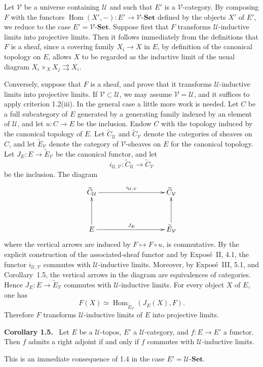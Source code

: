 \documentclass[11pt]{article}
\newcommand{\U}{\mathcal{U}}
\newcommand{\V}{\mathcal{V}}
\newcommand{\Set}{\mathbf{Set}}
\newcommand{\Hom}{\operatorname{Hom}}
\newenvironment{statement}[1]{\par\medskip\noindent\textbf{#1.}\ }{\par\medskip}
\begin{document}
Let \(\V\) be a universe containing \(\U\) and such that \(E'\) is a \(\V\)-category. By composing \(F\) with the functors \(\Hom(X',-):E'\to\V\text{-}\Set\) defined by the objects \(X'\) of \(E'\), we reduce to the case \(E'=\V\text{-}\Set\). Suppose first that \(F\) transforms \(\U\)-inductive limits into projective limits. Then it follows immediately from the definitions that \(F\) is a sheaf, since a covering family \(X_i\to X\) in \(E\), by definition of the canonical topology on \(E\), allows \(X\) to be regarded as the inductive limit of the usual diagram \(X_i\times_XX_j\rightrightarrows X_i\).

Conversely, suppose that \(F\) is a sheaf, and prove that it transforms \(\U\)-inductive limits into projective limits. If \(\V\subset\U\), we may assume \(\V=\U\), and it suffices to apply criterion 1.2(iii). In the general case a little more work is needed. Let \(C\) be a full subcategory of \(E\) generated by a generating family indexed by an element of \(\U\), and let \(u:C\to E\) be the inclusion. Endow \(C\) with the topology induced by the canonical topology of \(E\). Let \(\widetilde C_{\U}\) and \(\widetilde C_{\V}\) denote the categories of sheaves on \(C\), and let \(\widetilde E_{\V}\) denote the category of \(\V\)-sheaves on \(E\) for the canonical topology. Let \(J_E:E\to\widetilde E_{\V}\) be the canonical functor, and let
\[
i_{\U,\V}:\widetilde C_{\U}\longrightarrow \widetilde C_{\V}
\]
be the inclusion. The diagram
\[
\xymatrix@C=3.25cm@R=1.25cm{
\widetilde C_{\U} \ar[r]^{i_{\U,\V}} & \widetilde C_{\V}\cr
E \ar[r]^{J_E} \ar[u] & \widetilde E_{\V}\ar[u]
}
\]
where the vertical arrows are induced by \(F\mapsto F\circ u\), is commutative. By the explicit construction of the associated-sheaf functor and by Expos\'e~II, 4.1, the functor \(i_{\U,\V}\) commutes with \(\U\)-inductive limits. Moreover, by Expos\'e~III, 5.1, and Corollary~1.5, the vertical arrows in the diagram are equivalences of categories. Hence \(J_E:E\to\widetilde E_{\V}\) commutes with \(\U\)-inductive limits. For every object \(X\) of \(E\), one has
\[
F(X)\simeq \Hom_{\widetilde E_{\V}}(J_E(X),F).
\]
Therefore \(F\) transforms \(\U\)-inductive limits of \(E\) into projective limits.

\begin{statement}{Corollary 1.5}
Let \(E\) be a \(\U\)-topos, \(E'\) a \(\U\)-category, and \(f:E\to E'\) a functor. Then \(f\) admits a right adjoint if and only if \(f\) commutes with \(\U\)-inductive limits.
\end{statement}
This is an immediate consequence of 1.4 in the case \(E'=\U\text{-}\Set\).
\end{document}
